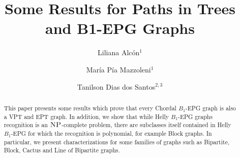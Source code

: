 \documentclass[9pt]{entcs}
\begin{document}


\begin{frontmatter}
  \title{Some Results for Paths in Trees and B1-EPG Graphs}
  
  
  
	\author{Liliana Alc\'{o}n$^{1}$}
	\author{Mar\'{i}a P\'{i}a Mazzoleni$^{1}$}
	\author{Tanilson Dias dos Santos$^{2,3}$}
	
	\address{$^{1}$Universidad Nacional de La Plata, La Plata, Argentina.\\$^{2}$Universidade Federal do Rio de Janeiro - UFRJ, Brazil. \\$^{3}$Universidade Federal do Tocantins - UFT, Brazil.}
	
	
	
	
	
	
	
	

\begin{abstract}
This paper presents some results which prove that every Chordal $B_1$-EPG graph is also a VPT and EPT graph. In addition, we show that while Helly $B_1$-EPG graphs recognition is an $\textsc{NP}$-complete problem, there are subclasses itself contained in Helly $B_1$-EPG for which the recognition is polynomial, for example Block graphs. In particular, we present characterizations for some families of graphs such as Bipartite, Block, Cactus and Line of Bipartite  graphs. %
\end{abstract}


\end{frontmatter}
\end{document}
